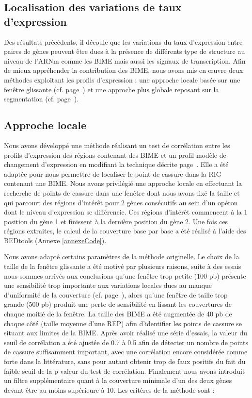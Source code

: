 \documentclass[12pt,a4paper]{report}
\begin{document}
\begin{onehalfspace}
\section*{Localisation des variations de taux d'expression}

Des résultats précédents, il découle que les variations du taux d’expression entre paires de gènes peuvent être dues à la présence de différents type de structure au niveau de l’ARNm comme les BIME mais aussi les signaux de transcription. Afin de mieux appréhender la contribution des BIME, nous avons mis en œuvre deux méthodes exploitant les profils d’expression : une approche locale basée sur une fenêtre glissante (cf. page~\pageref{methode_correlation}) et une approche plus globale reposant sur la segmentation (cf. page~\pageref{methode_segmentation}). 

\subsection*{Approche locale}
\label{approche_locale}
Nous avons développé une méthode réalisant un test de corrélation entre les profils d'expression des régions contenant des BIME et un profil modèle de changement d'expression en modifiant la technique décrite page~\pageref{methode_correlation}. Elle a été adaptée pour nous permettre de localiser le point de cassure dans la RIG contenant une BIME. Nous avons privilégié une approche locale en effectuant la recherche de points de cassure dans une fenêtre dont nous avons fixé la taille et qui parcourt des régions d'intérêt pour 2 gènes consécutifs au sein d'un opéron dont le niveau d'expression se différencie. Ces régions d'intérêt commencent à la 1 position du gène 1 et finissent à la dernière position du gène 2. Une fois ces régions extraites, le calcul de la couverture base par base a été réalisé à l'aide des BEDtools (Annexe \ref{annexeCode}).

Nous avons adapté certains paramètres de la méthode originelle. Le choix de la taille de la fenêtre glissante a été motivé par plusieurs raisons, suite à des essais nous sommes arrivés aux conclusions qu'une fenêtre trop petite (100 pb) présente une sensibilité trop importante aux variations locales dues au manque d'uniformité de la couverture (cf. page~\pageref{uniformite_couverture}), alors qu'une fenêtre de taille trop grande (500 pb) produit une perte de sensibilité en lissant les couvertures de chaque moitié de la fenêtre. La taille des BIME a été augmentée de 40 pb de chaque côté (taille moyenne d'une REP) afin d'identifier les points de cassure se situant aux limites de la BIME. Après avoir réalisé une série d'essais, la valeur du seuil de corrélation a été ajustée de 0.7 à 0.5 afin de détecter un nombre de points de cassure suffisamment important, avec une corrélation encore considérée comme forte dans la littérature, sans pour autant obtenir trop de faux positifs du fait du faible seuil de la p-valeur du test de corrélation. Finalement nous avons introduit un filtre supplémentaire quant à la couverture minimale d'un des deux gènes devant être au moins supérieure à 10. Les critères de la méthode sont :


\end{onehalfspace}
\end{document}
